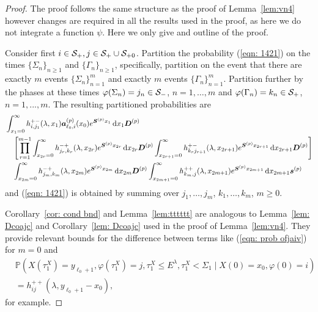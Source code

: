 \begin{proof}
	The proof follows the same structure as the proof of Lemma~\ref{lem:vn4} however changes are required in all the results used in the proof, as here we do not integrate a function \(\psi\). Here we only give and outline of the proof. 

	Consider first \(i\in \mathcal{S}_+,j\in\mathcal{S}_+\cup\mathcal{S}_{+0}\). Partition the probability (\ref{eqn: 1421}) on the times \(\{\Sigma_n\}_{n\geq 1}\) and \(\{\Gamma_n\}_{n\geq 1}\), specifically, partition on the event that there are exactly \(m\) events \(\{\Sigma_n\}_{n=1}^m\) and exactly \(m\) events \(\{\Gamma_n\}_{n=1}^m\). Partition further by the phases at these times \(\varphi(\Sigma_n)=j_n\in\mathcal{S}_-\), \(n=1,\dots,m\) and \(\varphi(\Gamma_n)=k_n\in\mathcal{S}_+\), \(n=1,...,m\). The resulting partitioned probabilities are
	\begin{align}
                 &\int_{x_1=0}^\infty h^{+-}_{i,j_{1}}(\lambda,x_1)\boldsymbol   a_{\ell_0,i}^{(p)}(x_0)e^{\boldsymbol{S}^{(p)}x_1}\, \mathrm{d} x_1 \boldsymbol{D}^{(p)}\nonumber
            	\\&\nonumber \quad \left[\prod_{r=1}^{m-1} \int_{x_{2r}=0}^\infty h^{-+}_{j_r,k_r}(\lambda,x_{2r}) e^{\boldsymbol{S}^{(p)}x_{2r}}\, \mathrm{d} x_{2r}\boldsymbol D^{(p)} \int_{x_{2r+1}=0}^\infty h^{+-}_{k_rj_{r+1}}(\lambda,x_{2r+1}) e^{\boldsymbol{S}^{(p)}x_{2r+1}} \, \mathrm{d} x_{2r+1}\boldsymbol D^{(p)}\right]
            	\\&
            	\quad \int_{x_{2m}=0}^\infty h^{-+}_{j_{m},k_m}(\lambda, x_{2m}) e^{\boldsymbol{S}^{(p)}x_{2m}} \, \mathrm{d} x_{2m} \boldsymbol{D}^{(p)}\int_{x_{2m+1}=0}^\infty h^{++}_{k_m,j}(\lambda,x_{2m+1}) e^{\boldsymbol{S}^{(p)}x_{2m+1}}\, \mathrm{d} x_{2m+1}\boldsymbol s^{(p)}  \label{eqn: prob ofjaiv}
	\end{align}
	and (\ref{eqn: 1421}) is obtained by summing over \(j_1,\dots,j_m\), \(k_1,\dots,k_m\), \(m\geq 0\). 
	
	Corollary~\ref{cor: cond bnd} and Lemma~\ref{lem:tttttt} are analogous to Lemma~\ref{lem: Dcoajc} and Corollary~\ref{lem: Dcoajc} used in the proof of Lemma~\ref{lem:vn4}. They provide relevant bounds for the difference between terms like (\ref{eqn: prob ofjaiv}) for \(m=0\) and 
	\begin{align*}
		&\mathbb P(X(\tau_1^X)=y_{\ell_0+1},\varphi(\tau_1^X)=j,\tau_1^X\leq E^\lambda, \tau_1^X<\Sigma_1 \mid X(0)=x_0, \varphi(0)=i) 
		\\&= h_{ij}^{++}(\lambda,y_{\ell_0+1}-x_0),
	\end{align*}
	for example.
	

\end{proof}
